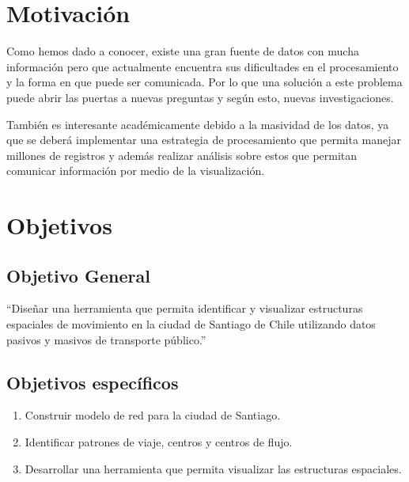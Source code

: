 \documentclass[12pt]{article}
\begin{document}
    \newpage
    \section{Motivación}


    Como hemos dado a conocer, existe una gran fuente de datos con mucha información pero que actualmente encuentra sus dificultades en el procesamiento y la forma en que puede ser comunicada. Por lo que una solución a este problema puede abrir las puertas a nuevas preguntas y según esto, nuevas investigaciones.

    También es interesante académicamente debido a la masividad de los datos, ya que se deberá implementar una estrategia de procesamiento que permita manejar millones de registros y además realizar análisis sobre estos que permitan comunicar información por medio de la visualización.

    \section{Objetivos}

    \subsection{Objetivo General}

    ``Diseñar una herramienta que permita identificar y visualizar estructuras espaciales de movimiento en la ciudad de Santiago de Chile utilizando datos pasivos y masivos de transporte público.''
    \subsection{Objetivos específicos}

    \begin{enumerate}
    \item Construir modelo de red para la ciudad de Santiago. %
    \item Identificar patrones de viaje, centros y centros de flujo.%
    \item Desarrollar una herramienta que permita visualizar las estructuras espaciales.
    \end{enumerate}
\end{document}

